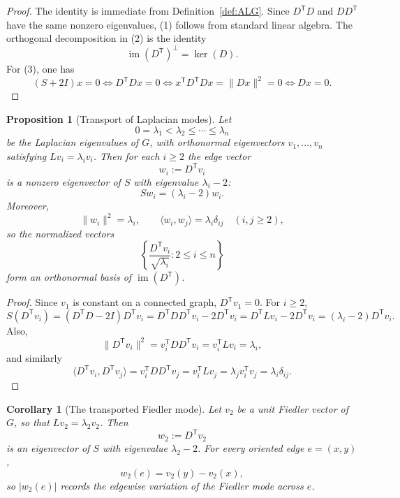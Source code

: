 \documentclass[11pt]{article}
\newtheorem{corollary}{Corollary}
\newtheorem{proposition}{Proposition}
\theoremstyle{plain}
\begin{document}
\begin{proof}
The identity is immediate from Definition~\ref{def:ALG}. Since $D^{\mathsf T}D$
and $DD^{\mathsf T}$ have the same nonzero eigenvalues, (1) follows from standard
linear algebra. The orthogonal decomposition in (2) is the identity
\[
\operatorname{im}(D^{\mathsf T})^{\perp}=\ker(D).
\]
For (3), one has
\[
(S+2I)x=0
\Longleftrightarrow
D^{\mathsf T}Dx=0
\Longleftrightarrow
x^{\mathsf T}D^{\mathsf T}Dx=\|Dx\|^2=0
\Longleftrightarrow
Dx=0.
\]
\end{proof}

\begin{proposition}[Transport of Laplacian modes]
\label{prop:transported-modes}
Let
\[
0=\lambda_1<\lambda_2\le \cdots \le \lambda_n
\]
be the Laplacian eigenvalues of $G$, with orthonormal eigenvectors
$v_1,\dots,v_n$ satisfying $Lv_i=\lambda_i v_i$.
Then for each $i\ge 2$ the edge vector
\[
w_i:=D^{\mathsf T}v_i
\]
is a nonzero eigenvector of $S$ with eigenvalue $\lambda_i-2$:
\[
Sw_i=(\lambda_i-2)w_i.
\]
Moreover,
\[
\|w_i\|^2=\lambda_i,
\qquad
\langle w_i,w_j\rangle=\lambda_i\delta_{ij}\quad(i,j\ge 2),
\]
so the normalized vectors
\[
\left\{\frac{D^{\mathsf T}v_i}{\sqrt{\lambda_i}}:2\le i\le n\right\}
\]
form an orthonormal basis of $\operatorname{im}(D^{\mathsf T})$.
\end{proposition}

\begin{proof}
Since $v_1$ is constant on a connected graph, $D^{\mathsf T}v_1=0$. For $i\ge2$,
\[
S(D^{\mathsf T}v_i)
=(D^{\mathsf T}D-2I)D^{\mathsf T}v_i
=D^{\mathsf T}DD^{\mathsf T}v_i-2D^{\mathsf T}v_i
=D^{\mathsf T}Lv_i-2D^{\mathsf T}v_i
=(\lambda_i-2)D^{\mathsf T}v_i.
\]
Also,
\[
\|D^{\mathsf T}v_i\|^2=v_i^{\mathsf T}DD^{\mathsf T}v_i=v_i^{\mathsf T}Lv_i=\lambda_i,
\]
and similarly
\[
\langle D^{\mathsf T}v_i,D^{\mathsf T}v_j\rangle
=v_i^{\mathsf T}DD^{\mathsf T}v_j
=v_i^{\mathsf T}Lv_j
=\lambda_j v_i^{\mathsf T}v_j
=\lambda_i\delta_{ij}.
\]
\end{proof}

\begin{corollary}[The transported Fiedler mode]
\label{cor:fiedler-transport}
Let $v_2$ be a unit Fiedler vector of $G$, so that $Lv_2=\lambda_2v_2$.
Then
\[
w_2:=D^{\mathsf T}v_2
\]
is an eigenvector of $S$ with eigenvalue $\lambda_2-2$.
For every oriented edge $e=(x,y)$,
\[
w_2(e)=v_2(y)-v_2(x),
\]
so $|w_2(e)|$ records the edgewise variation of the Fiedler mode across $e$.
\end{corollary}
\end{document}
